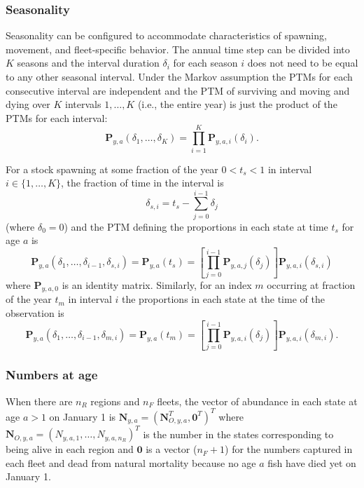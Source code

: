 \documentclass[
]{article}
\begin{document}
\hypertarget{seasonality}{%
\subsubsection*{Seasonality}\label{seasonality}}

Seasonality can be configured to accommodate characteristics of spawning, movement, and fleet-specific behavior. The annual time step can be divided into \(K\) seasons and the interval duration \(\delta_i\) for each season \(i\) does not need to be equal to any other seasonal interval. Under the Markov assumption the PTMs for each consecutive interval are independent and the PTM of surviving and moving and dying over \(K\) intervals \(1,\ldots, K\) (i.e., the entire year) is just the product of the PTMs for each interval:
\[ \mathbf{P}_{y,a}(\delta_1,\ldots,\delta_K) = \prod^K_{i=1}\mathbf{P}_{y,a,i}(\delta_i).\]

For a stock spawning at some fraction of the year \(0<t_s<1\) in interval \(i \in \{1,\ldots,K\}\), the fraction of time in the interval is
\[\delta_{s,i} = t_s-\sum^{i-1}_{j=0}\delta_j\]
(where \(\delta_0 = 0\)) and the PTM defining the proportions in each state at time \(t_s\) for age \(a\) is
\begin{equation}\label{eq:ptm_spawn}
\mathbf{P}_{y,a}\left(\delta_1,\ldots,\delta_{i-1}, \delta_{s,i}\right) = \mathbf{P}_{y,a}\left(t_s\right) =  \left[\prod^{i-1}_{j=0}\mathbf{P}_{y,a,j}(\delta_j)\right]\mathbf{P}_{y,a,i}(\delta_{s,i})
\end{equation}
where \(\mathbf{P}_{y,a,0}\) is an identity matrix. Similarly, for an index \(m\) occurring at fraction of the year \(t_m\) in interval \(i\) the proportions in each state at the time of the observation is
\begin{equation} \label{eq:ptm_index} 
\mathbf{P}_{y,a}\left(\delta_1,\ldots,\delta_{i-1}, \delta_{m,i}\right) = \mathbf{P}_{y,a}\left(t_m\right) =   \left[\prod^{i-1}_{j=0}\mathbf{P}_{y,a,i}(\delta_j)\right]\mathbf{P}_{y,a,i}(\delta_{m,i}).
\end{equation}

\hypertarget{numbers-at-age}{%
\subsubsection*{Numbers at age}\label{numbers-at-age}}

When there are \(n_R\) regions and \(n_F\) fleets, the vector of abundance in each state at age \(a>1\) on January 1 is \(\mathbf{N}_{y,a} = (\mathbf{N}_{O,y,a}^T, \mathbf{0}^T)^T\) where \(\mathbf{N}_{O,y,a} = (N_{y,a,1}, \ldots, N_{y,a,n_R})^T\) is the number in the states corresponding to being alive in each region and \(\mathbf{0}\) is a vector (\(n_F+1\)) for the numbers captured in each fleet and dead from natural mortality because no age \(a\) fish have died yet on January 1.
\end{document}
